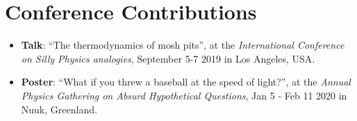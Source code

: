 \chapter*{Conference Contributions} \label{chapter:conferences}

\begin{itemize}

\item \textbf{Talk}: ``The thermodynamics of mosh pits'', at the \textit{International Conference on Silly Physics analogies}, September 5-7 2019 in Los Angeles, USA.

\item \textbf{Poster}: ``What if you threw a baseball at the speed of light?'', at the \textit{Annual Physics Gathering on Absurd Hypothetical Questions}, Jan 5 - Feb 11 2020 in Nuuk, Greenland.

\end{itemize}
